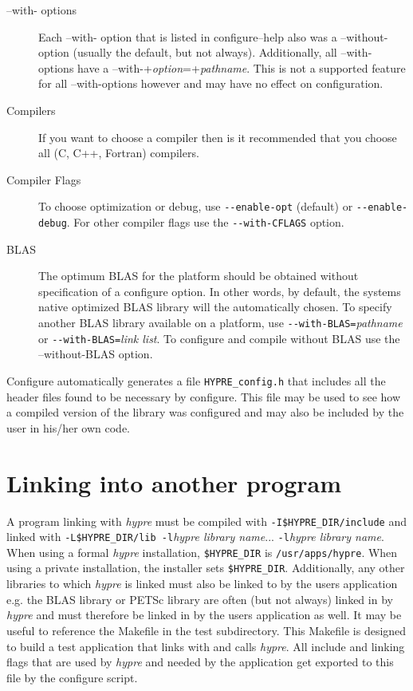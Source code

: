 \begin{description}

\item[--with- options] Each --with- option that is listed in configure--help also was a --without- option (usually the default, but not always).  Additionally, all --with- options have a --with-+{\itshape option}=+{\itshape pathname}.  This is not a supported feature for all --with-options however and may have no effect on configuration.  

\item[Compilers] If you want to choose a compiler then is it recommended
that you choose all (C, C++, Fortran) compilers.

\item[Compiler Flags] To choose optimization or debug, use
\verb+--enable-opt+ (default) or \verb+--enable-debug+.
For other compiler flags use the \verb+--with-CFLAGS+ option.  

\item[BLAS] The optimum BLAS for the platform should be obtained
without specification of a configure option.  In other words, by default, the systems native optimized BLAS library will the automatically chosen.
To specify another BLAS library available on a
platform, use \verb+--with-BLAS=+{\itshape pathname} or
\verb+--with-BLAS=+{\itshape link list}.  To configure and compile without BLAS use the --without-BLAS option.  
\end{description}

Configure automatically generates a file \verb+HYPRE_config.h+ that
includes all the header files found to be necessary by configure.
This file may be used to see how a compiled version of the library
was configured and may also be included by the user in his/her own code.

\section{Linking into another program}

A program linking with {\slshape hypre} must be compiled with
\verb+-I$HYPRE_DIR/include+ and linked with
\verb+-L$HYPRE_DIR/lib -l+{\itshape hypre library name}... 
\verb+-l+{\itshape hypre library name}.
When using a formal {\slshape hypre} installation, \verb+$HYPRE_DIR+ is
\verb+/usr/apps/hypre+.
When using a private installation, the installer sets \verb+$HYPRE_DIR+.
Additionally, any other libraries to which {\slshape hypre} is linked must also be linked to by the users application e.g. the BLAS library or PETSc library are often (but not always) linked in by {\slshape hypre} and must therefore be linked in by the users application as well.  It may be useful to reference the Makefile in the test subdirectory.  This Makefile is designed to build a test application that links with and calls {\slshape hypre}.  All include and linking flags that are used by {\slshape hypre} and needed by the application get exported to this file by the configure script.  
